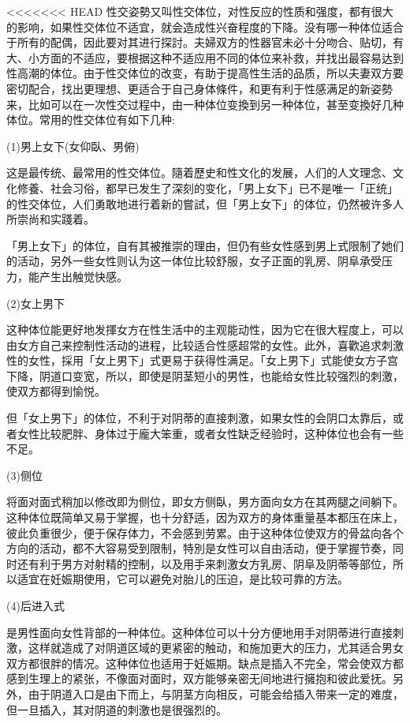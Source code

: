 \documentclass[12pt,UTF8]{ctexbook}
\begin{document}
<<<<<<< HEAD
性交姿勢又叫性交体位，对性反应的性质和强度，都有很大的影响，如果性交体位不适宜，就会造成性兴奋程度的下降。没有哪一种体位适合于所有的配偶，因此要对其进行探討。夫婦双方的性器官未必十分吻合、贴切，有大、小方面的不适应，要根据这种不适应用不同的体位来补救，并找出最容易达到性高潮的体位。由于性交体位的改变，有助于提高性生活的品质，所以夫妻双方要密切配合，找出更理想、更适合于自己身体條件，和更有利于性感满足的新姿勢来，比如可以在一次性交过程中，由一种体位变換到另一种体位，甚至变換好几种体位。常用的性交体位有如下几种:

(1)男上女下(女仰臥、男俯)

这是最传统、最常用的性交体位。隨着歷史和性文化的发展，人们的人文理念、文化修養、社会习俗，都早已发生了深刻的变化，「男上女下」已不是唯一「正统」的性交体位，人们勇敢地进行着新的嘗試，但「男上女下」的体位，仍然被许多人所崇尚和实踐着。

「男上女下」的体位，自有其被推崇的理由，但仍有些女性感到男上式限制了她们的活动，另外一些女性则认为这一体位比较舒服，女子正面的乳房、阴阜承受压力，能产生出触觉快感。

(2)女上男下

这种体位能更好地发揮女方在性生活中的主观能动性，因为它在很大程度上，可以由女方自己来控制性活动的进程，比较适合性感超常的女性。此外，喜歡追求刺激性的女性，採用「女上男下」式更易于获得性满足。「女上男下」式能使女方子宫下降，阴道口变宽，所以，即使是阴茎短小的男性，也能给女性比较强烈的刺激，使双方都得到愉悦。

但「女上男下」的体位，不利于对阴蒂的直接刺激，如果女性的会阴口太靠后，或者女性比较肥胖、身体过于龐大笨重，或者女性缺乏经验时，这种体位也会有一些不足。

(3)侧位

将面对面式稍加以修改即为侧位，即女方侧臥，男方面向女方在其两腿之间躺下。这种体位既简单又易于掌握，也十分舒适，因为双方的身体重量基本都压在床上，彼此负重很少，便于保存体力，不会感到劳累。由于这种体位使双方的骨盆向各个方向的活动，都不大容易受到限制，特別是女性可以自由活动，便于掌握节奏，同时还有利于男方对射精的控制，以及用手来刺激女方乳房、阴阜及阴蒂等部位，所以适宜在妊娠期使用，它可以避免对胎儿的压迫，是比较可靠的方法。

(4)后进入式

是男性面向女性背部的一种体位。这种体位可以十分方便地用手对阴蒂进行直接刺激，这样就造成了对阴道区域的更紧密的触动，和施加更大的压力，尤其适合男女双方都很胖的情况。这种体位也适用于妊娠期。缺点是插入不完全，常会使双方都感到生理上的紧张，不像面对面时，双方能够亲密无间地进行擁抱和彼此爱抚。另外，由于阴道入口是由下而上，与阴茎方向相反，可能会给插入带来一定的难度，但一旦插入，其对阴道的刺激也是很强烈的。
\end{document}
